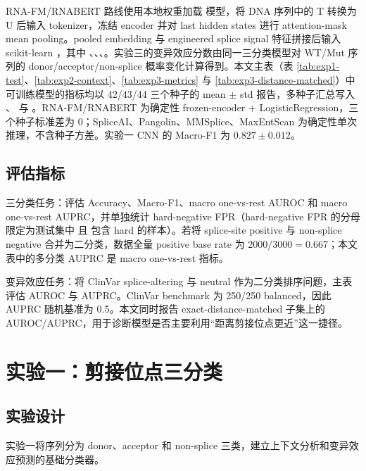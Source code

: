 \documentclass[
    oneside,
    fontset = win,
  ]{njuthesis}
\begin{document}
RNA-FM/RNABERT 路线使用本地权重加载  模型，将 DNA 序列中的 T 转换为 U 后输入 tokenizer，冻结 encoder 并对 last hidden states 进行 attention-mask mean pooling。pooled embedding 与 engineered splice signal 特征拼接后输入 scikit-learn ，其中 、、、。实验三的变异效应分数由同一三分类模型对 WT/Mut 序列的 donor/acceptor/non-splice 概率变化计算得到。本文主表（表 \ref{tab:exp1-test}、\ref{tab:exp2-context}、\ref{tab:exp3-metrics} 与 \ref{tab:exp3-distance-matched}）中可训练模型的指标均以 42/43/44 三个种子的 mean \(\pm\) std 报告，多种子汇总写入 、 与 。RNA-FM/RNABERT 为确定性 frozen-encoder + LogisticRegression，三个种子标准差为 0；SpliceAI、Pangolin、MMSplice、MaxEntScan 为确定性单次推理，不含种子方差。实验一 CNN 的 Macro-F1 为 \(0.827 \pm 0.012\)。

\section{评估指标}

三分类任务：评估 Accuracy、Macro-F1、macro one-vs-rest AUROC 和 macro one-vs-rest AUPRC，并单独统计 hard-negative FPR（hard-negative FPR 的分母限定为测试集中  且  包含 hard 的样本）。若将 splice-site positive 与 non-splice negative 合并为二分类，数据全量 positive base rate 为 \(2000/3000=0.667\)；本文表中的多分类 AUPRC 是 macro one-vs-rest 指标。

变异效应任务：将 ClinVar splice-altering 与 neutral 作为二分类排序问题，主表评估 AUROC 与 AUPRC。ClinVar benchmark 为 250/250 balanced，因此 AUPRC 随机基准为 0.5。本文同时报告 exact-distance-matched 子集上的 AUROC/AUPRC，用于诊断模型是否主要利用“距离剪接位点更近”这一捷径。

\chapter{实验一：剪接位点三分类}

\section{实验设计}

实验一将序列分为 donor、acceptor 和 non-splice 三类，建立上下文分析和变异效应预测的基础分类器。
\end{document}
